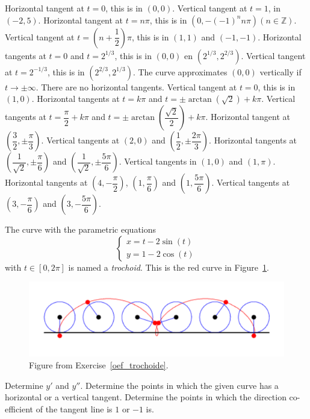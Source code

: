 \begin{Answer}\phantom{}
    
		\Question Horizontal tangent at $t = 0$, this is in $(0,0)$. Vertical tangent at $t = 1$,  in $(-2, 5)$. 
		\Question Horizontal tangent at $t = n \pi$, this is in $(0,-(-1)^n n \pi) (n \in \mathbb{Z})$. Vertical tangent at $t = \left(n + \dfrac{1}{2} \right) \pi$, this is in $(1, 1)$ and $(-1,-1)$. 
		\Question Horizontal tangents at $t = 0$ and $t = 2^{1/3}$, this is in $(0, 0)$ en $(2^{1/3}, 2^{2/3})$. Vertical tangent at $t = 2^{-1/3}$, this is in $(2^{2/3}, 2^{1/3})$. The curve approximates $(0, 0)$ vertically if $t \rightarrow \pm \infty$. 
		\Question There are no horizontal tangents. Vertical tangent at $t = 0$, this is in $(1,0)$.
		\Question Horizontal tangents at $t = k\pi$ and $t = \pm \arctan \left( \sqrt{2} \right) + k\pi$. Vertical tangents at $t=\dfrac{\pi}{2} + k \pi$ and $t = \pm \arctan \left( \dfrac{\sqrt{2}}{2} \right) + k\pi$.
		\Question Horizontal tangent at $\left(\dfrac{3}{2}, \pm \dfrac{\pi}{3} \right)$. 
		Vertical tangents at $(2, 0)$ and $\left(\dfrac{1}{2}, \pm \dfrac{2\pi}{3} \right)$.
		\Question Horizontal tangents at $\left(\dfrac{1}{\sqrt{2}}, \pm \dfrac{\pi}{6} \right)$ and $\left(\dfrac{1}{\sqrt{2}}, \pm \dfrac{5\pi}{6} \right)$. Vertical tangents in $(1, 0)$ and $(1, \pi)$.
		\Question Horizontal tangents at $\left(4,-\dfrac{\pi}{2}\right)$, $\left(1,\dfrac{\pi}{6}\right)$ and $\left(1,\dfrac{5\pi}{6}\right)$. Vertical tangents at $\left(3,-\dfrac{\pi}{6}\right)$ and $\left(3,-\dfrac{5\pi}{6}\right)$.
	
\end{Answer}

\ifcalculus
\begin{Exercise}[difficulty = 2,label = oef_trochoide] The curve with the parametric equations 
\[ \left\{\begin{array}{l} x = t - 2 \sin(t) \\ y = 1 - 2 \cos(t) \end{array}\right.  \]
with $t\in [0,2\pi]$ is named a \textit{trochoid}. This is the red curve in Figure~\ref{fig_parametric_26}. \label{oef_parametric_trochoide}
\begin{figure}[H]
    \centerline{
   \includegraphics[scale=0.8]{fig_parametric_26}
    }
    \caption{Figure from Exercise~\ref{oef_trochoide}.}
    \label{fig_parametric_26}
    \end{figure}
     \Question Determine $y'$ and $y''$.
     \Question Determine the points in which the given curve has a horizontal or a vertical tangent.
     \Question Determine the points in which the direction co-efficient of the tangent line is $1$ or $-1$ is.
  \end{Exercise}
 
